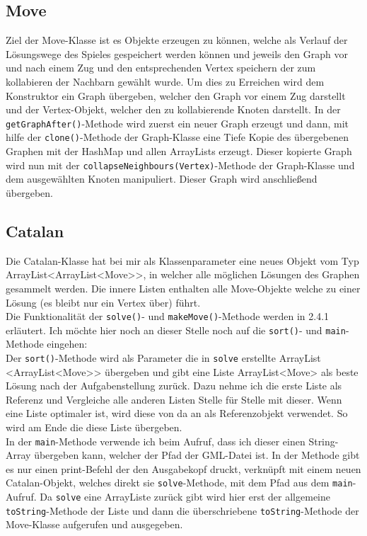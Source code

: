 \documentclass[12pt,a4paper]{article}
\begin{document}
\subsection{Move}
Ziel der Move-Klasse ist es Objekte erzeugen zu können, welche als \glqq Verlauf\grqq{} der Lösungswege des Spieles gespeichert werden können und jeweils den Graph vor und nach einem \glqq Zug\grqq{} und den entsprechenden Vertex speichern der zum kollabieren der Nachbarn gewählt wurde. Um dies zu Erreichen wird dem Konstruktor ein Graph übergeben, welcher den Graph vor einem Zug darstellt und der Vertex-Objekt, welcher den zu kollabierende Knoten darstellt. In der \texttt{getGraphAfter()}-Methode wird zuerst ein neuer Graph erzeugt und dann, mit hilfe der \texttt{clone()}-Methode der Graph-Klasse eine Tiefe Kopie des übergebenen Graphen mit der HashMap und allen ArrayLists erzeugt. Dieser kopierte Graph wird nun mit der \texttt{collapseNeighbours(Vertex)}-Methode der Graph-Klasse und dem ausgewählten Knoten manipuliert. Dieser Graph wird anschließend übergeben.

\subsection{Catalan}
Die Catalan-Klasse hat bei mir als Klassenparameter eine neues Objekt vom Typ ArrayList<ArrayList<Move>>, in welcher alle möglichen Lösungen des Graphen gesammelt werden. Die innere Listen enthalten alle Move-Objekte welche zu einer Lösung (es bleibt nur ein Vertex über) führt.\\
Die Funktionalität der \texttt{solve()}- und \texttt{makeMove()}-Methode werden in 2.4.1 erläutert. Ich möchte hier noch an dieser Stelle noch auf die \texttt{sort()}- und \texttt{main}-Methode eingehen:\\
Der \texttt{sort()}-Methode wird als Parameter die in \texttt{solve} erstellte ArrayList <ArrayList<Move>> übergeben und gibt eine Liste ArrayList<Move> als beste Lösung nach der Aufgabenstellung zurück. Dazu nehme ich die erste Liste als Referenz und Vergleiche alle anderen Listen Stelle für Stelle mit dieser. Wenn eine Liste optimaler ist, wird diese von da an als Referenzobjekt verwendet. So wird am Ende die diese Liste übergeben.\\
In der \texttt{main}-Methode verwende ich beim Aufruf, dass ich dieser einen String-Array übergeben kann, welcher der Pfad der GML-Datei ist. In der Methode gibt es nur einen print-Befehl der den Ausgabekopf druckt, verknüpft mit einem neuen Catalan-Objekt, welches direkt sie \texttt{solve}-Methode, mit dem Pfad aus dem \texttt{main}-Aufruf. Da \texttt{solve} eine ArrayListe zurück gibt wird hier erst der allgemeine \texttt{toString}-Methode der Liste und dann die überschriebene \texttt{toString}-Methode der Move-Klasse aufgerufen und ausgegeben.
\end{document}
